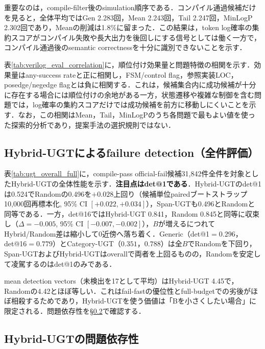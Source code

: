 \documentclass[submit,techrep,noauthor]{ipsj}
\begin{document}
重要なのは，compile-filter後のsimulation順序である．コンパイル通過候補だけを見ると，全体平均ではGen 2.283回，Mean 2.243回，Tail 2.247回，MinLogP 2.302回であり，Meanの削減は1.8\%に留まった．この結果は，token log確率の集約スコアがコンパイル失敗や長大出力を後回しにする信号としては働く一方で，コンパイル通過後のsemantic correctnessを十分に識別できないことを示す．



表\ref{tab:verilog_eval_correlation}に，順位付け効果量と問題特徴の相関を示す．効果量はany-success rateと正に相関し，FSM/control flag，参照実装LOC，posedge/negedge flagとは負に相関する．これは，候補集合内に成功候補が十分に存在する場合には順位付けの余地がある一方，状態遷移や複雑な制御を含む問題では，log確率の集約スコアだけでは成功候補を前方に移動しにくいことを示す．なお，この相関はMean，Tail，MinLogPのうち各問題で最もよい値を使った探索的分析であり，提案手法の選択規則ではない．

\subsection{Hybrid-UGTによるfailure detection（全件評価）}\label{sec:ugt_full}



表\ref{tab:ugt_overall_full}に，compile-pass official-fail候補31,842件全件を対象としたHybrid-UGTの全体性能を示す．\textbf{注目点はdet@1である}．Hybrid-UGTのdet@1は0.524でRandomの0.496を$+0.028$上回り（候補単位pairedブートストラップ10,000回再標本化, 95\% CI $[+0.022,+0.034]$），Span-UGTも0.496とRandomと同等である．一方，det@16ではHybrid-UGT 0.841，Random 0.845と同等に収束し（$\Delta = -0.005$, 95\% CI $[-0.007,-0.002]$），$B$が増えるにつれてHybrid/Random差は縮小して0近傍へ落ち着く．Generic（det@1$=0.296$，det@16$=0.779$）とCategory-UGT（$0.351$，$0.788$）は全$B$でRandomを下回り，Span-UGTおよびHybrid-UGTはoverallで両者を上回るものの，Randomを安定して凌駕するのはdet@1のみである．

mean detection vectors（未検出を17として平均）はHybrid-UGT 4.45で，Randomの4.42とほぼ等しい．これはfail-fastの優位性とfull-budgetでの劣後がほぼ相殺するためであり，Hybrid-UGTを使う価値は「Bを小さくしたい場合」に限定される．問題依存性を§\ref{sec:problem_dependence}で確認する．

\subsection{Hybrid-UGTの問題依存性}\label{sec:problem_dependence}
\end{document}
